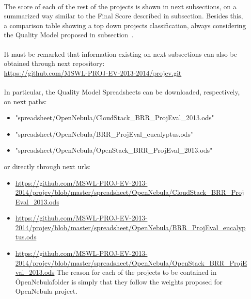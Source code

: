 \documentclass[11pt]{article}
\begin{document}
\\
The score of each of the rest of the projects is shown in next subsections, on a summarized way similar to the Final Score described in subsection\label{sec:final_score}. Besides this, a comparison table showing a top down projects classification, always considering the Quality Model proposed in subsection~.\\
\\
It must be remarked that information existing on next subsections can also be obtained through next repository:
\\
\url{https://github.com/MSWL-PROJ-EV-2013-2014/projev.git}\\
\\
In particular, the Quality Model Spreadsheets can be downloaded, respectively, on next paths:
\begin{itemize}\itemsep0pt
\item{"spreadsheet/OpenNebula/CloudStack\_BRR\_ProjEval\_2013.ods"}
\item{"spreadsheet/OpenNebula/BRR\_ProjEval\_eucalyptus.ods"}
\item{"spreadsheet/OpenNebula/OpenStack\_BRR\_ProjEval\_2013.ods"}
\end{itemize}
or directly through next urls:
\begin{itemize}\itemsep0pt
\item{\url{https://github.com/MSWL-PROJ-EV-2013-2014/projev/blob/master/spreadsheet/OpenNebula/CloudStack\_BRR\_ProjEval\_2013.ods}}
\item{\url{https://github.com/MSWL-PROJ-EV-2013-2014/projev/blob/master/spreadsheet/OpenNebula/BRR\_ProjEval\_eucalyptus.ods}}
\item{\url{https://github.com/MSWL-PROJ-EV-2013-2014/projev/blob/master/spreadsheet/OpenNebula/OpenStack\_BRR\_ProjEval\_2013.ods}}
The reason for each of the projects to be contained in \"OpenNebula\" folder is simply that they follow the weights proposed for OpenNebula project.
\end{itemize}
\end{document}

